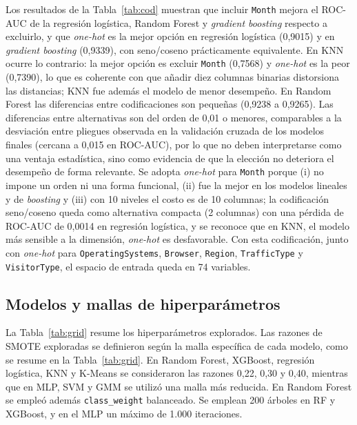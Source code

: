 \documentclass[conference]{IEEEtran}
\begin{document}
Los resultados de la Tabla~\ref{tab:cod} muestran que incluir \texttt{Month} mejora el ROC-AUC de la regresión logística, Random Forest y \emph{gradient boosting} respecto a excluirlo, y que \emph{one-hot} es la mejor opción en regresión logística (0,9015) y en \emph{gradient boosting} (0,9339), con seno/coseno prácticamente equivalente. En KNN ocurre lo contrario: la mejor opción es excluir \texttt{Month} (0,7568) y \emph{one-hot} es la peor (0,7390), lo que es coherente con que añadir diez columnas binarias distorsiona las distancias; KNN fue además el modelo de menor desempeño. En Random Forest las diferencias entre codificaciones son pequeñas (0,9238 a 0,9265). Las diferencias entre alternativas son del orden de 0,01 o menores, comparables a la desviación entre pliegues observada en la validación cruzada de los modelos finales (cercana a 0,015 en ROC-AUC), por lo que no deben interpretarse como una ventaja estadística, sino como evidencia de que la elección no deteriora el desempeño de forma relevante. Se adopta \emph{one-hot} para \texttt{Month} porque (i) no impone un orden ni una forma funcional, (ii) fue la mejor en los modelos lineales y de \emph{boosting} y (iii) con 10 niveles el costo es de 10 columnas; la codificación seno/coseno queda como alternativa compacta (2 columnas) con una pérdida de ROC-AUC de 0,0014 en regresión logística, y se reconoce que en KNN, el modelo más sensible a la dimensión, \emph{one-hot} es desfavorable. Con esta codificación, junto con \emph{one-hot} para \texttt{OperatingSystems}, \texttt{Browser}, \texttt{Region}, \texttt{TrafficType} y \texttt{VisitorType}, el espacio de entrada queda en 74 variables.

\subsection{Modelos y mallas de hiperparámetros}
La Tabla~\ref{tab:grid} resume los hiperparámetros explorados. Las razones de SMOTE exploradas se definieron según la malla específica de cada modelo, como se resume en la Tabla~\ref{tab:grid}. En Random Forest, XGBoost, regresión logística, KNN y K-Means se consideraron las razones 0,22, 0,30 y 0,40, mientras que en MLP, SVM y GMM se utilizó una malla más reducida. En Random Forest se empleó además \texttt{class\_weight} balanceado. Se emplean 200 árboles en RF y XGBoost, y en el MLP un máximo de 1.000 iteraciones.
\end{document}

